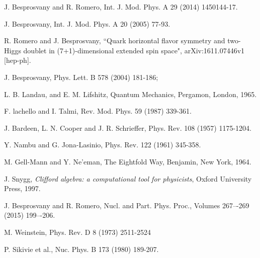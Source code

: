 \documentclass[12pt]{article}
\renewcommand\[{\begin{dmath}}
\renewcommand\]{\end{dmath}}
\begin{document}
\begin{thebibliography}{99}
    J. Besprosvany and R. Romero,   Int. J. Mod. Phys. A     29  (2014)   1450144-17.


    J. Besprosvany,  Int. J. Mod. Phys. A   20 (2005)  77-93.

  R. Romero  and J. Besprosvany, ``Quark horizontal flavor symmetry and two-Higgs doublet in (7+1)-dimensional extended spin space",  arXiv:1611.07446v1 [hep-ph].


 J. Besprosvany,
Phys. Lett. B   578 (2004)  181-186;

 L. B. Landau, and  E. M. Lifshitz,     Quantum Mechanics, Pergamon,
London,  1965.

F. lachello and
I. Talmi, Rev. Mod. Phys.    59  (1987) 339-361.

 J. Bardeen, L. N. Cooper and J. R. Schrieffer,
 Phys. Rev.  108 (1957) 1175-1204.

 Y. Nambu  and G. Jona-Lasinio,
 Phys. Rev.  122  (1961) 345-358.

 M. Gell-Mann and Y. Ne'eman,   The Eightfold Way, Benjamin, New York, 1964.

  J. Snygg,  {\it Clifford algebra: a computational tool for physicists}, Oxford University
Press, 1997.

   J. Besprosvany and R. Romero,
   Nucl. and Part. Phys. Proc.,
Volumes 267–-269 (2015)   199–-206.


M. Weinstein, Phys. Rev. D   8  (1973)  2511-2524


  P. Sikivie et al., Nuc.  Phys. B   173  (1980) 189-207.


\end{thebibliography}
\end{document}
